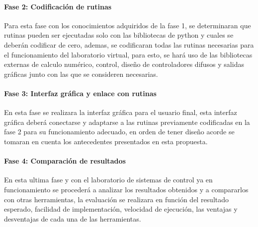 	\paragraph{Fase 2: Codificación de rutinas}
		
		Para esta fase con los conocimientos adquiridos de la fase 1, se determinaran que rutinas pueden ser ejecutadas solo con las bibliotecas de python y cuales se deberán codificar de cero, ademas, se codificaran todas las rutinas necesarias para el funcionamiento del laboratorio virtual, para esto, se hará uso de las bibliotecas externas de calculo numérico, control, diseño de controladores difusos y salidas gráficas junto con las que se consideren necesarias.
		
	\paragraph{Fase 3: Interfaz gráfica y enlace con rutinas}
		
		En esta fase se realizara la interfaz gráfica para el usuario final, esta interfaz gráfica deberá conectarse y adaptarse a las rutinas previamente codificadas en la fase 2 para su funcionamiento adecuado, en orden de tener diseño acorde se tomaran en cuenta los antecedentes presentados en esta propuesta.
		
	\paragraph{Fase 4: Comparación de resultados}
		
		En esta ultima fase y con el laboratorio de sistemas de control ya en funcionamiento se procederá a analizar los resultados obtenidos y a compararlos con otras herramientas, la evaluación se realizara en función del resultado esperado, facilidad de implementación, velocidad de ejecución, las ventajas y desventajas de cada una de las herramientas.